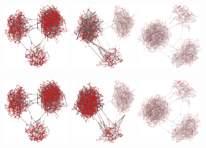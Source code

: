 \begin{figure}
\includegraphics[width=0.25\textwidth]{batchRun__kHalf=2-2-2_maxUpdate=0.08_noize=0_nbrDepth=2/network500-crop.pdf}
\hfill
\includegraphics[width=0.25\textwidth]{batchRun__kHalf=2-2-2_maxUpdate=0.08_noize=0_nbrDepth=2_fixedthreshold=0.4/network500-crop.pdf}
\hfill
\includegraphics[width=0.25\textwidth]{batchRun__kHalf=2-2-2_maxUpdate=0.08_noize=0_nbrDepth=2_fixedthreshold=0.2/network500-crop.pdf}

\includegraphics[width=0.25\textwidth]{batchRun__kHalf=2-2-2_maxUpdate=0.08_noize=0_nbrDepth=2/network750-crop.pdf}
\hfill
\includegraphics[width=0.25\textwidth]{batchRun__kHalf=2-2-2_maxUpdate=0.08_noize=0_nbrDepth=2_fixedthreshold=0.4/network750-crop.pdf}
\hfill
\includegraphics[width=0.25\textwidth]{batchRun__kHalf=2-2-2_maxUpdate=0.08_noize=0_nbrDepth=2_fixedthreshold=0.2/network750-crop.pdf}


\end{figure}
